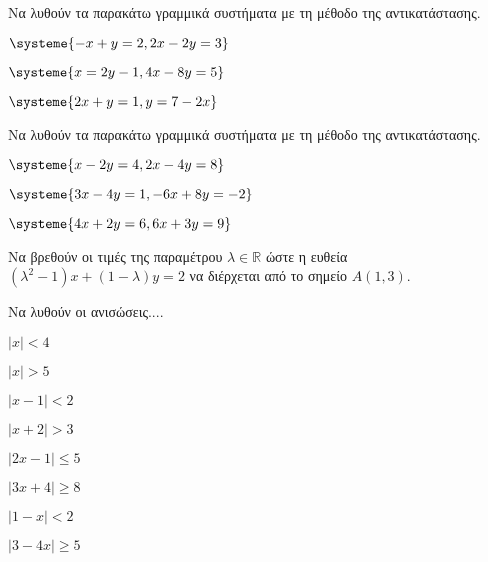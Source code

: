 Να λυθούν τα παρακάτω γραμμικά συστήματα με τη μέθοδο της αντικατάστασης.
\begin{multicols}{2}
\begin{rlist}[leftmargin=5mm]
\item $ \systeme{-x+y=2,2x-2y=3} $
\item $ \systeme{x=2y-1,4x-8y=5} $
\item $ \systeme{2x+y=1,y=7-2x} $
\end{rlist}
\end{multicols}

Να λυθούν τα παρακάτω γραμμικά συστήματα με τη μέθοδο της αντικατάστασης.
\begin{multicols}{2}
\begin{rlist}[leftmargin=5mm]
\item $ \systeme{x-2y=4,2x-4y=8} $
\item $ \systeme{3x-4y=1,-6x+8y=-2} $
\item $ \systeme{4x+2y=6,6x+3y=9} $
\end{rlist}
\end{multicols}

Να βρεθούν οι τιμές της παραμέτρου $ \lambda\in\mathbb{R} $ ώστε η ευθεία $ (\lambda^2-1)x+(1-\lambda)y=2 $ να διέρχεται από το σημείο $ A(1,3) $.

Να λυθούν οι ανισώσεις....
\begin{multicols}{4}
\begin{alist}
\item $ \left|x\right|<4 $
\item $ \left|x\right|>5 $
\item $ \left|x-1\right|<2 $
\item $ \left|x+2\right|>3 $
\item $ \left|2x-1\right|\leq5 $
\item $ \left|3x+4\right|\geq8 $
\item $ \left|1-x\right|<2 $
\item $ \left|3-4x\right|\geq5 $
\end{alist}
\end{multicols}



